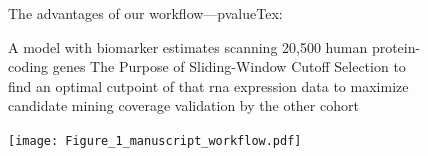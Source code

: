 \documentclass[
paper=landscape,
paper=160mm:90mm, %
fontsize=11pt, %
pagesize, %
parskip=half-, %
]{scrartcl} %
\theoremstyle{mythmstyle} %
\begin{document}
\begin{figure}

  \begin{minipage}[c]{0.45\linewidth}

The advantages of our workflow---pvalueTex:
\begin{outline}
\1 A model with biomarker estimates %
    \2 scanning 20,500 human protein-coding genes
\1 The Purpose of Sliding-Window Cutoff Selection
    \2 to find an optimal cutpoint of that \acrshort{rna} expression data 
    \2 to maximize candidate mining coverage
    \2 validation by the other cohort
\end{outline}
\end{minipage}
\hfill
\begin{minipage}[c]{0.5\linewidth}
\texttt{[image: Figure\_1\_manuscript\_workflow.pdf]} %


\end{minipage}
\end{figure}
\end{document}

